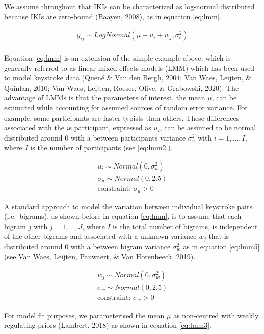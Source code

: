\documentclass[english,man,floatsintext]{apa7}
\begin{document}
We assume throughout that IKIs can be characterized as log-normal distributed because IKIs are zero-bound (Baayen, 2008), as in equation \ref{eq:lmm}.

\[
\tag{1}
\begin{aligned}
y_{ij} \sim LogNormal(\mu + u_i + w_j, \sigma_e^2)\\
\end{aligned}
\label{eq:lmm}
\]

Equation \ref{eq:lmm} is an extension of the simple example above, which is generally referred to as linear mixed effects models (LMM) which has been used to model keystroke data (Quené \& Van den Bergh, 2004; Van Waes, Leijten, \& Quinlan, 2010; Van Waes, Leijten, Roeser, Olive, \& Grabowski, 2020). The advantage of LMMs is that the parameters of interest, the mean \(\mu\), can be estimated while accounting for assumed sources of random error variance. For example, some participants are faster typists than others. These differences associated with the \(i\)s participant, expressed as \(u_i\), can be assumed to be normal distributed around 0 with a between participants variance \(\sigma_u^2\) with \(i = 1, \dots, I\), where \(I\) is the number of participants (see \ref{eq:lmm2}).

\[
\tag{2}
\begin{aligned}
u_i \sim Normal(0,\sigma_u^2)\\
\sigma_u \sim Normal(0,2.5)\\
\text{constraint: } \sigma_u >0 
\end{aligned}
\label{eq:lmm2}
\]

A standard approach to model the variation between individual keystroke pairs (i.e.~bigrams), as shown before in equation \ref{eq:lmm}, is to assume that each bigram \(j\) with \(j = 1, \dots, J\), where \(I\) is the total number of bigrams, is independent of the other bigrams and associated with a unknown variance \(w_j\) that is distributed around 0 with a between bigram variance \(\sigma_w^2\) as in equation \ref{eq:lmm5} (see Van Waes, Leijten, Pauwaert, \& Van Horenbeeck, 2019).

\[
\tag{3}
\begin{aligned}
w_j \sim Normal(0,\sigma_w^2)\\
\sigma_w \sim Normal(0,2.5)\\
\text{constraint: }\sigma_w >0 
\end{aligned}
\label{eq:lmm5}
\]

For model fit purposes, we parameterised the mean \(\mu\) as non-centred with weakly regulating priors (Lambert, 2018) as shown in equation \ref{eq:lmm3}.
\end{document}
